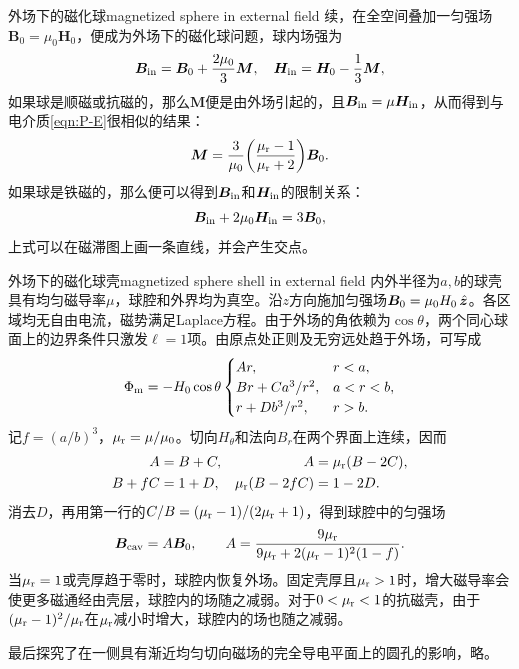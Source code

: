 \begin{example}{外场下的磁化球}{magnetized sphere in external field}
    续，在全空间叠加一匀强场$\bm B_0 = \mu_0\bm H_0$，便成为外场下的磁化球问题，球内场强为
    \[
        \bm B_{\mathrm{in}} = \bm B_0 + \frac{2\mu_0}3\bm M,\quad\bm H_{\mathrm{in}} = \bm H_0 - \frac13\bm M,
    \]
    如果球是顺磁或抗磁的，那么$\bm M$便是由外场引起的，且$\bm B_{\mathrm{in}} = \mu\bm H_{\mathrm{in}}$，从而得到与电介质\eqref{eqn:P-E}很相似的结果：
    \begin{equation}
        \label{eqn:M-B}
        \bm M = \frac3{\mu_0}\biggl(\frac{\mu_\mathrm r - 1}{\mu_\mathrm r + 2}\biggr)\bm B_0.
    \end{equation}
    如果球是铁磁的，那么便可以得到$\bm B_{\mathrm{in}}$和$\bm H_{\mathrm{in}}$的限制关系：
    \[
        \bm B_{\mathrm{in}} + 2\mu_0\bm H_{\mathrm{in}} = 3\bm B_0,
    \]
    上式可以在磁滞图上画一条直线，并会产生交点。
\end{example}
\begin{example}{外场下的磁化球壳}{magnetized sphere shell in external field}
    内外半径为$a,b$的球壳具有均匀磁导率$\mu$，球腔和外界均为真空。沿$z$方向施加匀强场$\bm B_0 = \mu_0 H_0\mathop{}\!\hat{\bm{z}}$。各区域均无自由电流，磁势满足Laplace方程。由于外场的角依赖为$\cos\theta$，两个同心球面上的边界条件只激发$\ell = 1$项。由原点处正则及无穷远处趋于外场，可写成
    \[
        \Phi_\mathrm m = -H_0\cos\theta
        \begin{cases}
            A r, & r < a,\\
            B r + C a^3/r^2, & a < r < b,\\
            r + D b^3/r^2, & r > b.
        \end{cases}
    \]
    记$f = (a/b)^3$，$\mu_\mathrm r = \mu/\mu_0$。切向$H_\theta$和法向$B_r$在两个界面上连续，因而
    \begin{align*}
        A &= B + C,     & A &= \mu_\mathrm r(B - 2C),\\
        B + fC &= 1 + D,  & \mu_\mathrm r(B - 2fC) &= 1 - 2D.
    \end{align*}
    消去$D$，再用第一行的$C/B = (\mu_\mathrm r - 1)/(2\mu_\mathrm r + 1)$，得到球腔中的匀强场
    \begin{equation}
        \bm B_{\mathrm{cav}} = A\bm B_0,\qquad
        A = \frac{9\mu_\mathrm r}
        {9\mu_\mathrm r + 2(\mu_\mathrm r - 1)^2(1 - f)}.
    \end{equation}
    当$\mu_\mathrm r = 1$或壳厚趋于零时，球腔内恢复外场。固定壳厚且$\mu_\mathrm r > 1$时，增大磁导率会使更多磁通经由壳层，球腔内的场随之减弱。对于$0 < \mu_\mathrm r < 1$的抗磁壳，由于$(\mu_\mathrm r - 1)^2/\mu_\mathrm r$在$\mu_\mathrm r$减小时增大，球腔内的场也随之减弱。
\end{example}
最后探究了在一侧具有渐近均匀切向磁场的完全导电平面上的圆孔的影响，略。

